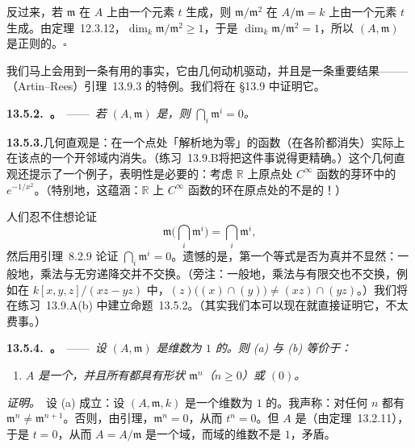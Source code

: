 反过来，若 $\mathfrak{m}$ 在 $A$ 上由一个元素 $t$ 生成，则 $\mathfrak{m}/\mathfrak{m}^2$ 在 $A/\mathfrak{m}=k$ 上由一个元素 $t$ 生成。由定理~12.3.12，$\dim_k\mathfrak{m}/\mathfrak{m}^2\ge1$，于是 $\dim_k\mathfrak{m}/\mathfrak{m}^2=1$，所以 $(A,\mathfrak{m})$ 是正则的。\hfill$\square$

我们马上会用到一条有用的事实，它由几何动机驱动，并且是一条重要结果——\trArtin--\trRees（Artin--Rees）引理~13.9.3 的特例。我们将在 \S13.9 中证明它。

\textbf{13.5.2.\ \trhProposition{}。}\ ——\ \emph{若 $(A,\mathfrak{m})$ 是\trNoetherian\trLocalRing，则 $\bigcap_i\mathfrak{m}^i=0$。}

\textbf{13.5.3.}\quad 几何直观是：在一个点处「解析地为零」的函数（在各阶都消失）实际上在该点的一个开邻域内消失。（\mbox{练习~13.9.B}将把这件事说得更精确。）这个几何直观还提示了一个例子，表明\trNoetherian{}性是必要的：考虑 $\mathbb{R}$ 上原点处 $C^{\infty}$ 函数的芽环中的 $e^{-1/x^2}$。（特别地，这蕴涵：$\mathbb{R}$ 上 $C^{\infty}$ 函数的环在原点处的\trLocalization{}不是\trNoetherian{}的！）

人们忍不住想论证
\begin{equation*}\tag{13.5.3.1}\label{eq:m-powers-intersection}
\mathfrak{m}\bigl(\textstyle\bigcap_i\mathfrak{m}^i\bigr)=\textstyle\bigcap_i\mathfrak{m}^i,
\end{equation*}
然后用\trNakayama{}引理~8.2.9 论证 $\bigcap_i\mathfrak{m}^i=0$。遗憾的是，第一个等式是否为真并不显然：一般地，乘法与无穷递降交并不交换。（旁注：一般地，乘法与有限交也不交换，例如在 $k[x,y,z]/(xz-yz)$ 中，$(z)\bigl((x)\cap(y)\bigr)\neq(xz)\cap(yz)$。）我们将在\mbox{练习~13.9.A(b)} 中建立命题~13.5.2。（其实我们本可以现在就直接证明它，不太费事。）

\textbf{13.5.4.\ \trhTheorem{}。}\ ——\ \emph{设 $(A,\mathfrak{m})$ 是维数为 $1$ 的\trNoetherian\trLocalRing。则 (a) 与 (b) 等价于：}
\begin{enumerate}[label=(\alph*),start=3]
\item \emph{$A$ 是一个\trIntegralDomain，并且所有\trIdeal{}都具有形状 $\mathfrak{m}^n$（$n\ge0$）或 $(0)$。}
\end{enumerate}

\emph{证明。}\ 设 (a) 成立：设 $(A,\mathfrak{m},k)$ 是一个维数为 $1$ 的\trRegular\trLocalRing。我声称：对任何 $n$ 都有 $\mathfrak{m}^n\neq\mathfrak{m}^{n+1}$。否则，由\trNakayama{}引理，$\mathfrak{m}^n=0$，从而 $t^n=0$。但 $A$ 是\trIntegralDomain（由定理~13.2.11），于是 $t=0$，从而 $A=A/\mathfrak{m}$ 是一个域，而域的维数不是 $1$，矛盾。

